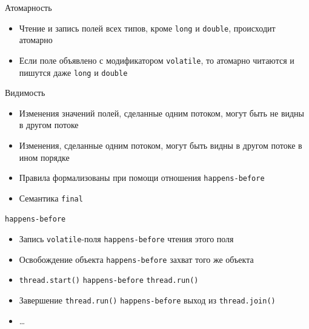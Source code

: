 \documentclass[unicode,mathserif]{beamer}
\begin{document}
\begin{frame}{Атомарность}
\begin{itemize}
\item Чтение и запись полей всех типов, кроме \lstinline|long|
    и \lstinline|double|, происходит атомарно
    \bigskip

\item Если поле объявлено с модификатором \lstinline|volatile|,
    то атомарно читаются и пишутся даже \lstinline|long|
    и \lstinline|double|
\end{itemize}
\end{frame}


\begin{frame}{Видимость}
\begin{itemize}
\item Изменения значений полей, сделанные одним потоком, могут быть не видны
    в другом потоке
    \bigskip

\item Изменения, сделанные одним потоком, могут быть видны в другом
    потоке в ином порядке
    \bigskip

\item Правила формализованы при помощи отношения \texttt{happens-before}
    \bigskip

\item Семантика \texttt{final}
\end{itemize}
\end{frame}


\begin{frame}{\texttt{happens-before}}
\begin{itemize}
\item Запись \lstinline|volatile|-поля \texttt{happens-before} чтения этого поля
    \bigskip

\item Освобождение объекта \texttt{happens-before} захват того же объекта
    \bigskip

\item \lstinline|thread.start()| \texttt{happens-before} \lstinline|thread.run()|
    \bigskip

\item Завершение \lstinline|thread.run()| \texttt{happens-before} 
    выход из \lstinline|thread.join()|
    \bigskip

\item \ldots
\end{itemize}
\end{frame}
\end{document}
